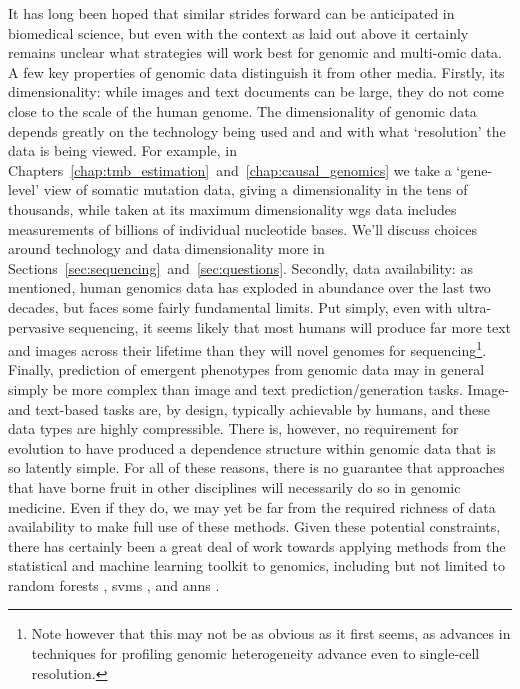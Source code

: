 \documentclass[thesis.tex]{subfiles}
\begin{document}
It has long been hoped that similar strides forward can be anticipated in biomedical science, but even with the context as laid out above it certainly remains unclear what strategies will work best for genomic and multi-omic data. A few key properties of genomic data distinguish it from other media. Firstly, its dimensionality: while images and text documents can be large, they do not come close to the scale of the human genome. The dimensionality of genomic data depends greatly on the technology being used and and with what `resolution' the data is being viewed. For example, in Chapters~\ref{chap:tmb_estimation}~and~\ref{chap:causal_genomics} we take a `gene-level' view of somatic mutation data, giving a dimensionality in the tens of thousands, while taken at its maximum dimensionality \gls{wgs} data includes measurements of billions of individual nucleotide bases. We'll discuss choices around technology and data dimensionality more in Sections~\ref{sec:sequencing}~and~\ref{sec:questions}. Secondly, data availability: as mentioned, human genomics data has exploded in abundance over the last two decades, but faces some fairly fundamental limits. Put simply, even with ultra-pervasive sequencing, it seems likely that most humans will produce far more text and images across their lifetime than they will novel genomes for sequencing\footnote{Note however that this may not be as obvious as it first seems, as advances in techniques for profiling genomic heterogeneity advance even to single-cell resolution.}. Finally, prediction of emergent phenotypes from genomic data may in general simply be more complex than image and text prediction/generation tasks. Image- and text-based tasks are, by design, typically achievable by humans, and these data types are highly compressible. There is, however, no requirement for evolution to have produced a dependence structure within genomic data that is so latently simple. For all of these reasons, there is no guarantee that approaches that have borne fruit in other disciplines will necessarily do so in genomic medicine. Even if they do, we may yet be far from the required richness of data availability to make full use of these methods.
Given these potential constraints, there has certainly been a great deal of work towards applying methods from the statistical and machine learning toolkit to genomics, including but not limited to random forests \citep{breiman_random_2001, chen_random_2012}, \glspl{svm} \citep{cortes_support-vector_1995, huang_applications_2018}, and \glspl{ann} \citep{avsec_effective_2021, tran_deep_2021}. 
 
\end{document}
